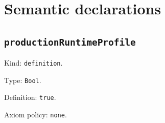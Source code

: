 \documentclass[11pt]{article}
\begin{document}
\section*{Semantic declarations}
\subsection*{\texttt{productionRuntimeProfile}}
\noindent Kind: \texttt{definition}.\par
\noindent Type: \texttt{Bool}.\par
\noindent Definition: \texttt{true}.\par
\noindent Axiom policy: \texttt{none}.\par
\end{document}
